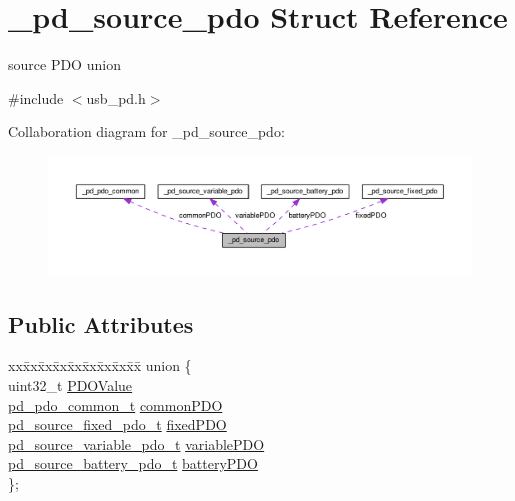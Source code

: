 \hypertarget{struct__pd__source__pdo}{\section{\-\_\-pd\-\_\-source\-\_\-pdo Struct Reference}
\label{struct__pd__source__pdo}
}


source P\-D\-O union  




{\ttfamily \#include $<$usb\-\_\-pd.\-h$>$}



Collaboration diagram for \-\_\-pd\-\_\-source\-\_\-pdo\-:
\nopagebreak
\begin{figure}[H]
\begin{center}
\leavevmode
\includegraphics[width=350pt]{struct__pd__source__pdo__coll__graph}
\end{center}
\end{figure}
\subsection*{Public Attributes}
\begin{DoxyCompactItemize}
\item 
\begin{tabbing}
xx\=xx\=xx\=xx\=xx\=xx\=xx\=xx\=xx\=\kill
union \{\\
\>uint32\_t \hyperlink{struct__pd__source__pdo_ae7c1220b81dd8506c6731d7a6adc6ac9}{PDOValue}\\
\>\hyperlink{group__usb__pd__stack_ga7b2f5a42b9f5ae0e5b76f2ed44482ff3}{pd\_pdo\_common\_t} \hyperlink{struct__pd__source__pdo_ad1af05b25c2dfc8f72eea50707536c10}{commonPDO}\\
\>\hyperlink{group__usb__pd__stack_gaa7dd48248cb5b3177c59635a91f1b16e}{pd\_source\_fixed\_pdo\_t} \hyperlink{struct__pd__source__pdo_a2405f8ee75a370cba4a48b94080958b1}{fixedPDO}\\
\>\hyperlink{group__usb__pd__stack_ga0c9d6847951d8b95ecfac843574c027d}{pd\_source\_variable\_pdo\_t} \hyperlink{struct__pd__source__pdo_a81d5ae3b407a289661136aa515ba1942}{variablePDO}\\
\>\hyperlink{group__usb__pd__stack_ga5f2a906851b2fe0554a083085c62324b}{pd\_source\_battery\_pdo\_t} \hyperlink{struct__pd__source__pdo_ae677c279b52a30bc6ca29600d978757e}{batteryPDO}\\
\}; \\

\end{tabbing}\end{DoxyCompactItemize}


